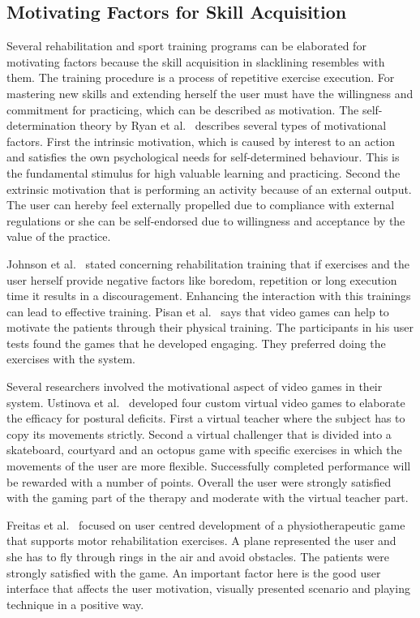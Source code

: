 \subsection{Motivating Factors for Skill Acquisition}

Several rehabilitation and sport training programs can be elaborated for motivating factors because the skill acquisition in slacklining resembles with them. The training procedure is a process of repetitive exercise execution. For mastering new skills and extending herself the user must have the willingness and commitment for practicing, which can be described as motivation. The self-determination theory by Ryan et al.~\cite{Ryan2000-jn, Ryan2000-gi} describes several types of motivational factors. First the intrinsic motivation, which is caused by interest to an action and satisfies the own psychological needs for self-determined behaviour. This is the fundamental stimulus for high valuable learning and practicing. Second the extrinsic motivation that is performing an activity because of an external output. The user can hereby feel externally propelled due to compliance with external regulations or she can be self-endorsed due to willingness and acceptance by the value of the practice. 

Johnson et al.~\cite{Johnson1998-hb} stated concerning rehabilitation training that if exercises and the user herself provide negative factors like boredom, repetition or long execution time it results in a discouragement. Enhancing the interaction with this trainings can lead to effective training. 
Pisan et al.~\cite{Pisan2013-sf} says that video games can help to motivate the patients through their physical training. The participants in his user tests found the games that he developed engaging. They preferred doing the exercises with the system.

Several researchers involved the motivational aspect of video games in their system. Ustinova et al.~\cite{Ustinova2014-ml} developed four custom virtual video games to elaborate the efficacy for postural deficits. First a virtual teacher where the subject has to copy its movements strictly. Second a virtual challenger that is divided into a skateboard, courtyard and an octopus game with specific exercises in which the movements of the user are more flexible. Successfully completed performance will be rewarded with a number of points. Overall the user were strongly satisfied with the gaming part of the therapy and moderate with the virtual teacher part.

Freitas et al.~\cite{Freitas2012-ae} focused on user centred development of a physiotherapeutic game that supports motor rehabilitation exercises. A plane represented the user and she has to fly through rings in the air and avoid obstacles. The patients were strongly satisfied with the game. An important factor here is the good user interface that affects the user motivation, visually presented scenario and playing technique in a positive way.

